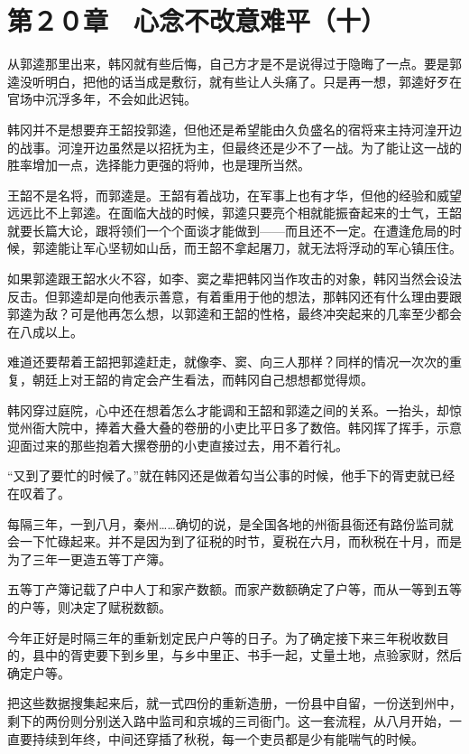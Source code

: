 \section{第２０章　心念不改意难平（十）}

从郭逵那里出来，韩冈就有些后悔，自己方才是不是说得过于隐晦了一点。要是郭逵没听明白，把他的话当成是敷衍，就有些让人头痛了。只是再一想，郭逵好歹在官场中沉浮多年，不会如此迟钝。

韩冈并不是想要弃王韶投郭逵，但他还是希望能由久负盛名的宿将来主持河湟开边的战事。河湟开边虽然是以招抚为主，但最终还是少不了一战。为了能让这一战的胜率增加一点，选择能力更强的将帅，也是理所当然。

王韶不是名将，而郭逵是。王韶有着战功，在军事上也有才华，但他的经验和威望远远比不上郭逵。在面临大战的时候，郭逵只要亮个相就能振奋起来的士气，王韶就要长篇大论，跟将领们一个个面谈才能做到——而且还不一定。在遭逢危局的时候，郭逵能让军心坚韧如山岳，而王韶不拿起屠刀，就无法将浮动的军心镇压住。

如果郭逵跟王韶水火不容，如李、窦之辈把韩冈当作攻击的对象，韩冈当然会设法反击。但郭逵却是向他表示善意，有着重用于他的想法，那韩冈还有什么理由要跟郭逵为敌？可是他再怎么想，以郭逵和王韶的性格，最终冲突起来的几率至少都会在八成以上。

难道还要帮着王韶把郭逵赶走，就像李、窦、向三人那样？同样的情况一次次的重复，朝廷上对王韶的肯定会产生看法，而韩冈自己想想都觉得烦。

韩冈穿过庭院，心中还在想着怎么才能调和王韶和郭逵之间的关系。一抬头，却惊觉州衙大院中，捧着大叠大叠的卷册的小吏比平日多了数倍。韩冈挥了挥手，示意迎面过来的那些抱着大摞卷册的小吏直接过去，用不着行礼。

“又到了要忙的时候了。”就在韩冈还是做着勾当公事的时候，他手下的胥吏就已经在叹着了。

每隔三年，一到八月，秦州……确切的说，是全国各地的州衙县衙还有路份监司就会一下忙碌起来。并不是因为到了征税的时节，夏税在六月，而秋税在十月，而是为了三年一更造五等丁产簿。

五等丁产簿记载了户中人丁和家产数额。而家产数额确定了户等，而从一等到五等的户等，则决定了赋税数额。

今年正好是时隔三年的重新划定民户户等的日子。为了确定接下来三年税收数目的，县中的胥吏要下到乡里，与乡中里正、书手一起，丈量土地，点验家财，然后确定户等。

把这些数据搜集起来后，就一式四份的重新造册，一份县中自留，一份送到州中，剩下的两份则分别送入路中监司和京城的三司衙门。这一套流程，从八月开始，一直要持续到年终，中间还穿插了秋税，每一个吏员都是少有能喘气的时候。

